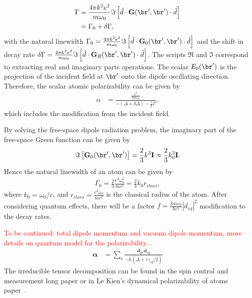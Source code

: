 \documentclass[]{report}
\begin{document}
\begin{align}
\Gamma &= \frac{4\pi k^2e^2}{m\omega_0}\Im\left[\hat{d}\cdot\mathbf{G}(\br',\br')\cdot \hat{d}\right]\\
&= \Gamma_0 + \delta \Gamma,
\end{align}
with the natural linewidth $ \Gamma_0=\frac{4\pi k^2 e^2}{m\omega_0}\Im\left[\hat{d}\cdot\mathbf{G}_0(\br',\br')\cdot \hat{d}\right] $ and the shift in decay rate $ \delta\Gamma=\frac{4\pi k^2e^2}{m\omega_0}\Im\left[\hat{d}\cdot\mathbf{G}_R(\br',\br')\cdot \hat{d}\right] $. The scripts $ \Re $ and $ \Im $ correspond to extracting real and imaginary parts operations. The scalar $ E_0(\br') $ is the projection of the incident field at $ \br' $ onto the dipole oscillating direction. Therefore, the scalar atomic polarizability can be given by
\begin{align}
\alpha &= \frac{\frac{e^2}{2m\omega_0}}{-(\Delta+\delta \Delta)-\frac{i}{2}\Gamma},
\end{align}
which includes the modification from the incident field. 

By solving the free-space dipole radiation problem, the imaginary part of the free-space Green function can be given by
\begin{align}
\Im\left[\mathbf{G}_0(\br',\br') \right] =\frac{2}{3}k^3 \mathbf{I} \approx \frac{2}{3}k^3_0\mathbf{I}.
\end{align}
Hence the natural linewidth of an atom can be given by
\begin{align}
\Gamma_0 = \frac{2}{3}\frac{e^2\omega_0^2}{mc^3}=\frac{2}{3}k_0r_{class},
\end{align}
where $ k_0=\omega_0/c $, and $ r_{class}= \frac{e^2\omega_0}{mc^2}$ is the classical radius of the atom. After considering quantum effects, there will be a factor $ f=\frac{2m\omega_0}{\hbar e^2}|d_{eg}|^2 $ modification to the decay rates. 

\textcolor{red}{To be continued: total dipole momentum and vacuum dipole momentum, more details on quantum model for the polarizability...}
\begin{align}
\boldsymbol{\alpha} &= \sum_e \frac{\mathbf{d}_{ge}\mathbf{d}_{eg}}{-\hbar(\Delta+i\gamma_{eg}/2)}
\end{align}
The irreducible tensor decomposition can be found in the spin control and measurement long paper\cite{Deutsch2010a} or in Le Kien's dynamical polarizability of atoms paper~\cite{LeKien2013}. 
\end{document}
